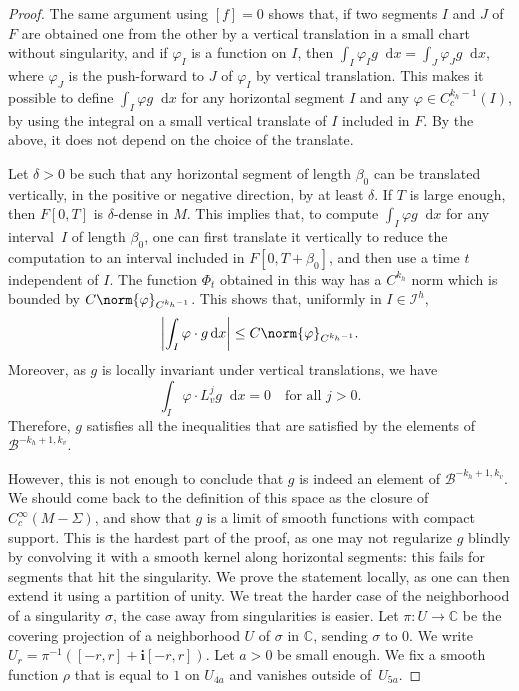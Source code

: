 \documentclass[JEP,XML,SOM,Unicode]{cedram}
\newcommand{\boI}{\mathcal{I}}
\newcommand{\boB}{\mathcal{B}}
\newcommand{\CC}{\mathbb{C}}
\newcommand{\dd}{\mathop{}\!\mathrm{d}}
\newcommand{\ic}{\mathbf{i}}
\newcommand{\absgg}[1]{\biggl \lvert#1\biggr\rvert}
\let\phi\varphi
\theoremstyle{definition}
\numberwithin{equation}{section}
\begin{document}
\begin{proof}
The same argument using $[f] = 0$ shows that, if two segments $I$ and $J$ of
$F$ are obtained one from the other by a vertical translation in a small
chart without singularity, and if $\phi_I$ is a function on $I$, then $\int_I
\phi_I g \dd x = \int_J \phi_J g \dd x$, where $\phi_J$ is the push-forward
to $J$ of $\phi_I$ by vertical translation. This makes it possible to define
$\int_I \phi g \dd x$ for any horizontal segment $I$ and any $\phi \in
C^{k_h-1}_c(I)$, by using the integral on a small vertical translate of $I$
included in $F$. By the above, it does not depend on the choice of the
translate.

Let $\delta>0$ be such that any horizontal segment of length $\beta_0$ can be
translated vertically, in the positive or negative direction, by at least
$\delta$. If $T$ is large enough, then $F[0,T]$ is $\delta$-dense in $M$.
This implies that, to compute $\int_I \phi g \dd x$ for any interval~$I$ of
length $\beta_0$, one can first translate it vertically to reduce the
computation to an interval included in $F[0,T+\beta_0]$, and then use a time
$t$ independent of $I$. The function $\Phi_t$ obtained in this way has a
$C^{k_h}$ norm which is bounded by $C\norm{\phi}_{C^{k_h-1}}$. This shows
that, uniformly in $I \in \boI^h$,
\begin{equation*}
\absgg{\int_I \phi \cdot g \dd x} \leq C \norm{\phi}_{C^{k_h-1}}.
\end{equation*}
Moreover, as $g$ is locally invariant under vertical translations, we have
\[
\int_I \phi \cdot L_v^j g \dd x = 0\quad\text{for all }j>0.
\]
Therefore, $g$ satisfies
all the inequalities that are satisfied by the elements of $\boB^{-k_h+1,
k_v}$.

However, this is not enough to conclude that $g$ is indeed an element of
$\boB^{-k_h+1, k_v}$. We should come back to the definition of this space as
the closure of $C^\infty_c(M-\Sigma)$, and show that $g$ is a limit of smooth
functions with compact support. This is the hardest part of the proof, as one
may not regularize $g$ blindly by convolving it with a smooth kernel along
horizontal segments: this fails for segments that hit the singularity. We
prove the statement locally, as one can then extend it using a partition of
unity. We treat the harder case of the neighborhood of a singularity
$\sigma$, the case away from singularities is easier. Let $\pi: U \to \CC$ be
the covering projection of a neighborhood $U$ of $\sigma$ in $\CC$, sending
$\sigma$ to $0$. We write $U_r = \pi^{-1}([-r, r] + \ic [-r, r])$. Let $a>0$
be small enough. We fix a smooth function $\rho$ that is equal to $1$ on
$U_{4a}$ and vanishes outside of~$U_{5a}$.


\end{proof}
\end{document}
